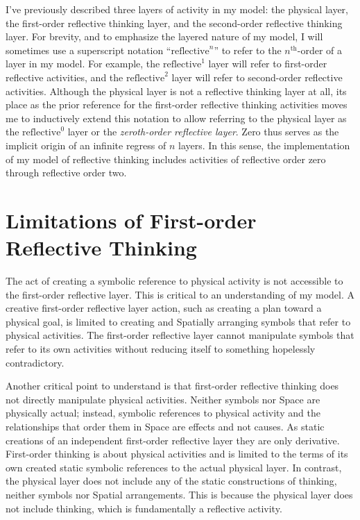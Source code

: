 I've previously described three layers of activity in my model: the
physical layer, the first-order reflective thinking layer, and the
second-order reflective thinking layer.  For brevity, and to emphasize
the layered nature of my model, I will sometimes use a superscript
notation ``$\text{reflective}^n$'' to refer to the $n^\text{th}$-order
of a layer in my model.  For example, the $\text{reflective}^1$ layer
will refer to first-order reflective activities, and the
$\text{reflective}^2$ layer will refer to second-order reflective
activities.  Although the physical layer is not a reflective thinking
layer at all, its place as the prior reference for the first-order
reflective thinking activities moves me to inductively extend this
notation to allow referring to the physical layer as the
$\text{reflective}^0$ layer or the \emph{zeroth-order reflective
  layer}.  Zero thus serves as the implicit origin of an infinite
regress of $n$ layers.  In this sense, the implementation of my model
of reflective thinking includes activities of reflective order zero
through reflective order two.

\section{Limitations of First-order Reflective Thinking}

The act of creating a symbolic reference to physical activity is not
accessible to the first-order reflective layer.  This is critical to
an understanding of my model.  A creative first-order reflective layer
action, such as creating a plan toward a physical goal, is limited to
creating and Spatially arranging symbols that refer to physical
activities.  The first-order reflective layer cannot manipulate
symbols that refer to its own activities without reducing itself to
something hopelessly contradictory.

Another critical point to understand is that first-order reflective
thinking does not directly manipulate physical activities.  Neither
symbols nor Space are physically actual; instead, symbolic references
to physical activity and the relationships that order them in Space
are effects and not causes.  As static creations of an independent
first-order reflective layer they are only derivative.  First-order
thinking is about physical activities and is limited to the terms of
its own created static symbolic references to the actual physical
layer.  In contrast, the physical layer does not include any of the
static constructions of thinking, neither symbols nor Spatial
arrangements.  This is because the physical layer does not include
thinking, which is fundamentally a reflective activity.

